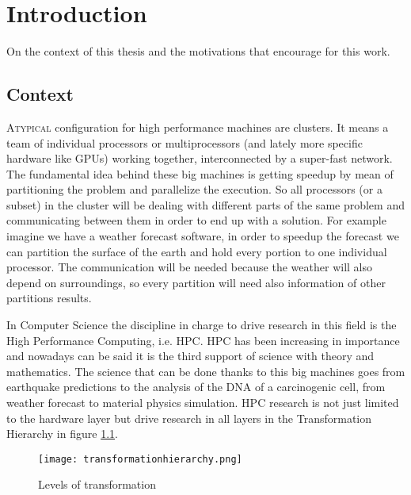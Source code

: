 \chapter{Introduction}

On the context of this thesis and the motivations that encourage for this work.

\section{Context}
\lettrine{A}{typical} configuration for high performance machines are clusters.
It means a team of individual processors or multiprocessors 
(and lately more specific 
hardware like GPUs) working together, interconnected by a super-fast network. 
The fundamental idea behind these big machines is getting speedup by mean of
partitioning the problem and parallelize the execution. So all processors (or a 
subset) in the cluster will be dealing with different parts of the same problem 
and communicating between them in order to end up with a solution. For example 
imagine we have a weather forecast software, in order to speedup the forecast 
we can partition the surface of the earth and hold every portion to one individual
processor. The communication will be needed because the weather will also depend 
on surroundings, so every partition will need also information of other partitions 
results.

In Computer Science the discipline in charge to drive research in this field is 
the High Performance Computing, i.e. HPC. HPC has been increasing in importance 
and nowadays can be said it is the third support of science with theory and 
mathematics. The science that can be done thanks to this big machines goes from 
earthquake predictions to the analysis of the DNA of a carcinogenic cell, from
weather forecast to material physics simulation. HPC research is not just limited
to the hardware layer but drive research in all layers in the Transformation 
Hierarchy\cite{transformationHierarchy} in figure \ref{transformationHierarchyImg}.

\begin{figure}
  \caption{Levels of transformation}
  \label{transformationHierarchyImg}
  \centering
    \texttt{[image: transformationhierarchy.png]}
\end{figure}

